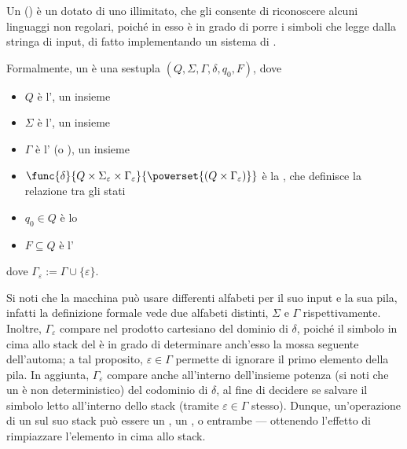 \documentclass[a4paper, 12pt]{report}
\begin{document}
    \begin{frameddefn}{\PDA}
        Un \tbf{\PDA} () è un \NFA dotato di uno  illimitato, che gli consente di riconoscere alcuni linguaggi non regolari, poiché in esso è in grado di porre i simboli che legge dalla stringa di input, di fatto implementando un sistema di .

        Formalmente, un \PDA è una sestupla $(Q, \Sigma, \Gamma, \delta, q_0, F)$, dove

        \begin{itemize}
            \item $Q$ è l', un insieme 
            \item $\Sigma$ è l', un insieme 
            \item $\Gamma$ è l' (o ), un insieme 
            \item $\func{\delta}{Q \times \Sigma_\varepsilon \times \Gamma_\varepsilon}{\powerset{(Q \times \Gamma_\varepsilon)}}$ è la , che definisce la relazione tra gli stati
            \item $q_0 \in Q$ è lo 
            \item $F \subseteq Q$ è l'
        \end{itemize}

        dove $\Gamma_\varepsilon := \Gamma \cup \{ \varepsilon \}$.

        Si noti che la macchina può usare differenti alfabeti per il suo input e la sua pila, infatti la definizione formale vede due alfabeti distinti, $\Sigma$ e $\Gamma$ rispettivamente. Inoltre, $\Gamma_\varepsilon$ compare nel prodotto cartesiano del dominio di $\delta$, poiché il simbolo in cima allo stack del \PDA è in grado di determinare anch'esso la mossa seguente dell'automa; a tal proposito, $\varepsilon \in \Gamma$ permette di ignorare il primo elemento della pila. In aggiunta, $\Gamma_\varepsilon$ compare anche all'interno dell'insieme potenza (si noti che un \PDA è non deterministico) del codominio di $\delta$, al fine di decidere se salvare il simbolo letto all'interno dello stack  (tramite $\varepsilon \in \Gamma$ stesso). Dunque, un'operazione di un \PDA sul suo stack può essere un , un , o entrambe --- ottenendo l'effetto di rimpiazzare l'elemento in cima allo stack.
    \end{frameddefn}
\end{document}
